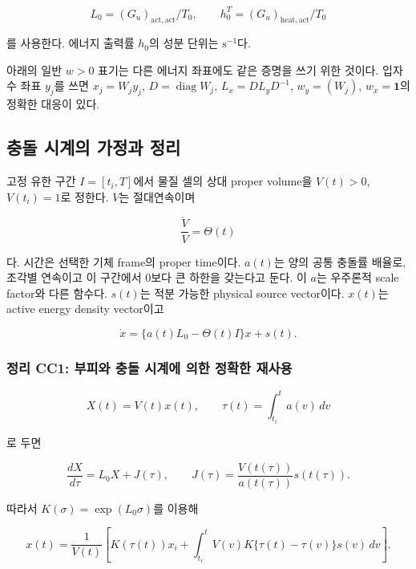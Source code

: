 \[
L_0=(G_u)_{\mathrm{act},\mathrm{act}}/T_0,\qquad
h_0^T=(G_u)_{\mathrm{heat},\mathrm{act}}/T_0
\tag{1.3}
\]

를 사용한다. 에너지 출력률 \(h_0\)의 성분 단위는 \(\mathrm{s^{-1}}\)다.

아래의 일반 \(w>0\) 표기는 다른 에너지 좌표에도 같은 증명을 쓰기 위한 것이다. 입자수 좌표 \(y_j\)를 쓰면 \(x_j=W_jy_j\), \(D=\operatorname{diag}W_j\), \(L_x=DL_yD^{-1}\), \(w_y=(W_j)\), \(w_x=\mathbf1\)의 정확한 대응이 있다.

\hypertarget{uxcda9uxb3cc-uxc2dcuxacc4uxc758-uxac00uxc815uxacfc-uxc815uxb9ac}{%
\subsection{충돌 시계의 가정과 정리}\label{uxcda9uxb3cc-uxc2dcuxacc4uxc758-uxac00uxc815uxacfc-uxc815uxb9ac}}

고정 유한 구간 \(I=[t_i,T]\)에서 물질 셀의 상대 proper volume을 \(V(t)>0\), \(V(t_i)=1\)로 정한다. \(V\)는 절대연속이며

\[
\frac{\dot V}{V}=\Theta(t)
\tag{2.1}
\]

다. 시간은 선택한 기체 frame의 proper time이다. \(a(t)\)는 양의 공통 충돌률 배율로, 조각별 연속이고 이 구간에서 0보다 큰 하한을 갖는다고 둔다. 이 \(a\)는 우주론적 scale factor와 다른 함수다. \(s(t)\)는 적분 가능한 physical source vector이다. \(x(t)\)는 active energy density vector이고

\[
\dot x=\{a(t)L_0-\Theta(t)I\}x+s(t).
\tag{2.2}
\]

\hypertarget{uxc815uxb9ac-cc1-uxbd80uxd53cuxc640-uxcda9uxb3cc-uxc2dcuxacc4uxc5d0-uxc758uxd55c-uxc815uxd655uxd55c-uxc7acuxc0acuxc6a9}{%
\subsubsection{정리 CC1: 부피와 충돌 시계에 의한 정확한 재사용}\label{uxc815uxb9ac-cc1-uxbd80uxd53cuxc640-uxcda9uxb3cc-uxc2dcuxacc4uxc5d0-uxc758uxd55c-uxc815uxd655uxd55c-uxc7acuxc0acuxc6a9}}

\[
X(t)=V(t)x(t),\qquad
\tau(t)=\int_{t_i}^{t}a(v)\,dv
\tag{2.3}
\]

로 두면

\[
\boxed{
\frac{dX}{d\tau}=L_0X+J(\tau),\qquad
J(\tau)=\frac{V(t(\tau))}{a(t(\tau))}s(t(\tau)).
}
\tag{2.4}
\]

따라서 \(K(\sigma)=\exp(L_0\sigma)\)를 이용해

\[
\boxed{
x(t)=\frac1{V(t)}
\left[
K(\tau(t))x_i+
\int_{t_i}^{t}V(v)K\{\tau(t)-\tau(v)\}s(v)\,dv
\right].
}
\tag{2.5}
\]


